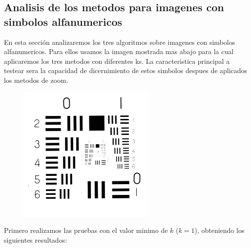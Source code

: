 \subsection{Analisis de los metodos para imagenes con simbolos alfanumericos}
En esta sección analizaremos los tres algoritmos sobre imagenes con simbolos alfanumericos. Para ellos usamos la imagen mostrada mas abajo para la cual aplicaremos los tres metodos con diferentes ks. La caracteristica principal a testear sera la capacidad de dicernimiento de estos simbolos despues de aplicados los metodos de zoom.

\begin{figure}[H]
\centering
\includegraphics[scale=0.50]{fotos/alfanum/orig.png}
\end{figure}

Primero realizamos las pruebas con el valor minimo de $k$ ($k=1$), obteniendo los siguientes resultados:


